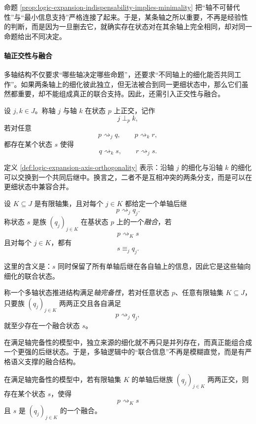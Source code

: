 命题 \ref{prop:logic-expansion-indispensability-implies-minimality} 把“轴不可替代性”与“最小信息支持”严格连接了起来。于是，某条轴之所以重要，不再是经验性的判断，而是因为一旦删去它，就确实存在状态对在其余轴上完全相同，却对同一命题给出不同决定。

\paragraph{轴正交性与融合}
多轴结构不仅要求“哪些轴决定哪些命题”，还要求“不同轴上的细化能否共同工作”。如果两条轴上的细化彼此独立，但无法被合到同一更细状态中，那么它们虽然都重要，却不能组成真正的联合支持。因此，还需引入正交性与融合。

\begin{definition}[轴正交性]\label{def:logic-expansion-axis-orthogonality}
设 \(j,k\in J\)。称轴 \(j\) 与轴 \(k\) 在状态 \(p\) 上正交，记作
\[
j\perp_p k,
\]
若对任意
\[
p\rightsquigarrow_j q,
\qquad
p\rightsquigarrow_k r,
\]
都存在某个状态 \(s\) 使得
\[
q\rightsquigarrow_k s,
\qquad
r\rightsquigarrow_j s.
\]
\end{definition}

定义 \ref{def:logic-expansion-axis-orthogonality} 表示：沿轴 \(j\) 的细化与沿轴 \(k\) 的细化可以交换到一个共同后继中。换言之，二者不是互相冲突的两条分支，而是可以在更细状态中兼容合并。

\begin{definition}[融合]\label{def:logic-expansion-fusion}
设 \(K\subseteq J\) 是有限轴集，且对每个 \(j\in K\) 都给定一个单轴后继
\[
p\rightsquigarrow_j q_j.
\]
称状态 \(s\) 是族 \((q_j)_{j\in K}\) 在基状态 \(p\) 上的一个\emph{融合}，若
\[
p\rightsquigarrow_K s
\]
且对每个 \(j\in K\)，都有
\[
s\equiv_j q_j.
\]
\end{definition}

这里的含义是：\(s\) 同时保留了所有单轴后继在各自轴上的信息，因此它是这些轴向细化的联合状态。

\begin{definition}[轴完备性]\label{def:logic-expansion-axis-completeness}
称一个多轴状态推进结构满足\emph{轴完备性}，若对任意状态 \(p\)、任意有限轴集 \(K\subseteq J\)，只要族 \((q_j)_{j\in K}\) 两两正交且各自满足
\[
p\rightsquigarrow_j q_j,
\]
就至少存在一个融合状态 \(s\)。
\end{definition}

在满足轴完备性的模型中，独立来源的细化就不再只是并列存在，而真正能组合成一个更强的后继状态。于是，多轴逻辑中的“联合信息”不再是模糊直觉，而是有严格语义支撑的融合结构。

\begin{proposition}[正交族的联合可达性]\label{prop:logic-expansion-orthogonal-family-joint-reachability}
在满足轴完备性的模型中，若有限轴集 \(K\) 的单轴后继族 \((q_j)_{j\in K}\) 两两正交，则存在某个状态 \(s\)，使得
\[
p\rightsquigarrow_K s
\]
且 \(s\) 是 \((q_j)_{j\in K}\) 的一个融合。
\end{proposition}

